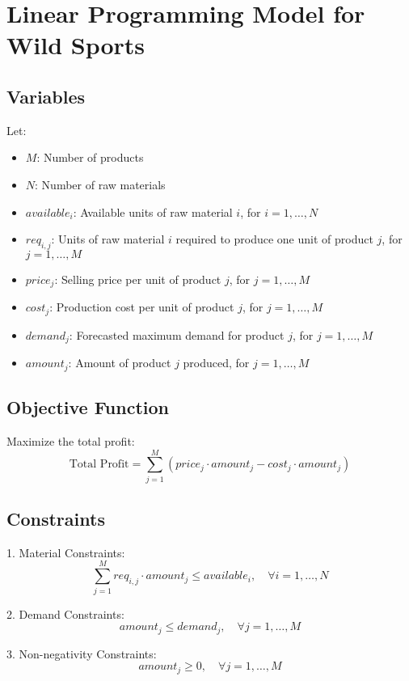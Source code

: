 \documentclass{article}
\begin{document}
\section*{Linear Programming Model for Wild Sports}

\subsection*{Variables}
Let:
\begin{itemize}
    \item $M$: Number of products
    \item $N$: Number of raw materials
    \item $available_{i}$: Available units of raw material $i$, for $i = 1, \ldots, N$
    \item $req_{i,j}$: Units of raw material $i$ required to produce one unit of product $j$, for $j = 1, \ldots, M$
    \item $price_{j}$: Selling price per unit of product $j$, for $j = 1, \ldots, M$
    \item $cost_{j}$: Production cost per unit of product $j$, for $j = 1, \ldots, M$
    \item $demand_{j}$: Forecasted maximum demand for product $j$, for $j = 1, \ldots, M$
    \item $amount_{j}$: Amount of product $j$ produced, for $j = 1, \ldots, M$
\end{itemize}

\subsection*{Objective Function}
Maximize the total profit:
\[
\text{Total Profit} = \sum_{j=1}^{M} (price_{j} \cdot amount_{j} - cost_{j} \cdot amount_{j})
\]

\subsection*{Constraints}
1. Material Constraints:
\[
\sum_{j=1}^{M} req_{i,j} \cdot amount_{j} \leq available_{i}, \quad \forall i = 1, \ldots, N
\]

2. Demand Constraints:
\[
amount_{j} \leq demand_{j}, \quad \forall j = 1, \ldots, M
\]

3. Non-negativity Constraints:
\[
amount_{j} \geq 0, \quad \forall j = 1, \ldots, M
\]
\end{document}
